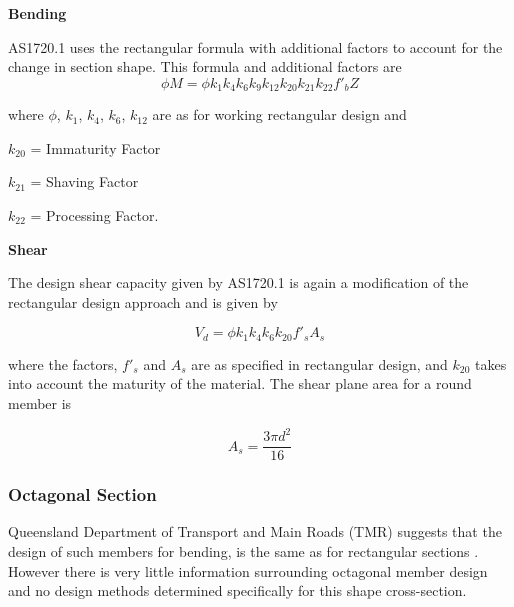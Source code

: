\documentclass[11pt,a4paper]{article}
\numberwithin{equation}{subsection}
\begin{document}
	\vspace*{\baselineskip}
	
	\noindent
	\textbf{Bending}\par
	\noindent
    AS1720.1 uses the rectangular formula with additional factors to account for the change in section shape. This formula and additional factors are
	\begin{equation}
	\phi M = \phi k_{1} k_{4} k_{6} k_{9} k_{12} k_{20} k_{21} k_{22} f'_{b} Z
	\end{equation}

    \noindent
    where $\phi$, $k_{1}$, $k_{4}$, $k_{6}$, $k_{12}$ are as for working rectangular design and \par
    
    $ k_{20} $ = Immaturity Factor\par
    
    $ k_{21} $ = Shaving Factor\par
    
    $ k_{22} $ = Processing Factor.\par
	
	\vspace*{\baselineskip}
		
	\noindent
	\textbf{Shear}\par
	\noindent
	The design shear capacity given by AS1720.1 is again a modification of the rectangular design approach and is given by 
	
	\begin{equation}
	V_{d} = \phi k_{1} k_{4} k_{6} k_{20} f'_{s} A_{s}
	\end{equation}
	
	\noindent
	where the factors, $f'_{s}$ and $A_{s}$ are as specified in rectangular design, and $k_{20}$ takes into account the maturity of the material. The shear plane area for a round member is\par
	
	\begin{equation}
	A_{s} = \dfrac{3\pi d^{2}}{16}
	\end{equation}
	
	
	\noindent
	
	\subsubsection{Octagonal Section}
    Queensland Department of Transport and Main Roads (TMR) suggests that the design of such members for bending, is the same as for rectangular sections \cite{_timber_2005}. However there is very little information surrounding octagonal member design and no design methods determined specifically for this shape cross-section.
\end{document}
